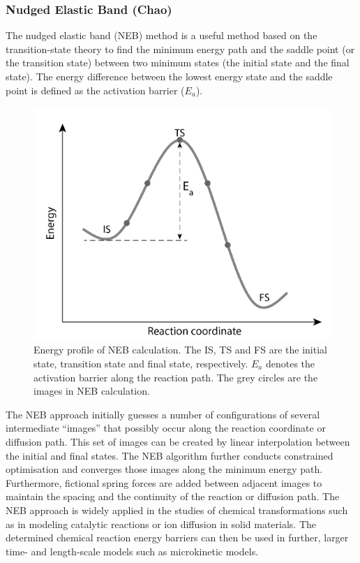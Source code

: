 \documentclass[../main.tex]{subfiles}
\begin{document}
\subsubsection{Nudged Elastic Band (Chao)} 
\label{sec:methods_neb}

The nudged elastic band (NEB) method is a useful method based on the transition-state theory to find the minimum energy path and the saddle point (or the transition state) between two minimum states (the initial state and the final state).\cite{henkelman2000climbing,henkelman2000improved} The energy difference between the lowest energy state and the saddle point is defined as the activation barrier ($E_a$). \cite{henkelman2000improved}

\begin{figure}
    \centering
    \includegraphics[scale=0.6]{figures/NEB_profile.png}
    \caption{Energy profile of NEB calculation. The IS, TS and FS are the initial state, transition state and final state, respectively. $E_a$ denotes the activation barrier along the reaction path. The grey circles are the images in NEB calculation.}
    \label{fig:NEB_profile}
\end{figure}

The NEB approach initially guesses a number of configurations of several intermediate ``images'' that possibly occur along the reaction coordinate or diffusion path. This set of images can be created by linear interpolation between the initial and final states. The NEB algorithm further conducts constrained optimisation and converges those images along the minimum energy path. Furthermore, fictional spring forces are added between adjacent images to maintain the spacing and the continuity of the reaction or diffusion path. The NEB approach is widely applied in the studies of chemical transformations such as in modeling catalytic reactions or ion diffusion in solid materials. The determined chemical reaction energy barriers can then be used in further, larger time- and length-scale models such as  microkinetic models.\cite{peng2020lithium,Mercer2021}
\end{document}
